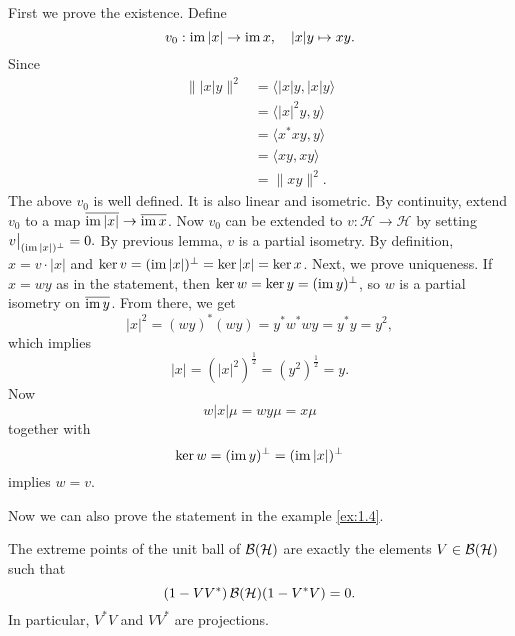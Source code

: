 \begin{myproof}
  First we prove the existence. Define $$v_0 : \operatorname{im} |x| \to \operatorname{im} x,\quad |x|y \mapsto xy.$$
  Since \begin{align*}
    \| |x| y\|^2 &= \langle |x|y, |x|y \rangle \\
    &= \langle |x|^2 y, y\rangle\\
    &= \langle x^* x y, y\rangle\\
    &= \langle xy, xy\rangle\\
    &= \| xy\|^2.
  \end{align*}
  The above $v_0$ is well defined. It is also linear and isometric.
  By continuity, extend $v_0$ to a map $\overline{\operatorname{im} |x|} \to \overline{\operatorname{im} x}$.
  Now $v_0$ can be extended to $v: \mathcal{H} \to \mathcal{H}$ by setting 
  $v\big|_{(\operatorname{im} |x|)^\perp} = 0.$ By previous lemma, $v$ is a partial isometry.
  By definition, $x = v \cdot |x|$ and $\ker v = (\operatorname{im} |x|)^\perp = \ker |x| = \ker x$.
  Next, we prove uniqueness. If $x = wy$ as in the statement, then $\ker w = \ker y = (\operatorname{im} y)^\perp$,
  so $w$ is a partial isometry on $\overline{\operatorname{im} y}$. From there, we get 
  $$|x|^2 = (wy)^* (wy) = y^* w^* w y = y^* y = y^2,$$
  which implies 
  $$|x| = (|x|^2)^{\frac{1}{2}} = (y^2)^{\frac{1}{2}} = y.$$
  Now $$w|x| \mu = wy \mu = x\mu$$
  together with 
  $$\ker w = (\operatorname{im} y)^\perp = (\operatorname{im} |x|)^\perp$$ implies $w = v$.
\end{myproof}

Now we can also prove the statement in the example \ref{ex:1.4}.

\begin{proposition}
  The extreme points of the unit ball of $\operatorname{\mathcal{B} (\mathcal{H})}$ are exactly the elements $V \in \operatorname{\mathcal{B} (\mathcal{H})}$ such that 
  $$(1 - V V^*) \operatorname{\mathcal{B} (\mathcal{H})} (1 - V^* V) = 0.$$ In particular, $V^* V$ and $V V^*$ are projections.
\end{proposition}

